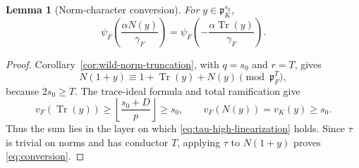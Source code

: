\documentclass[11pt]{amsart}
\newtheorem{lemma}[theorem]{Lemma}
\theoremstyle{definition}
\theoremstyle{remark}
\newcommand{\p}{\mathfrak p}
\newcommand{\Tr}{\operatorname{Tr}}
\begin{document}
\begin{lemma}[Norm-character conversion]\label{lem:norm-character-conversion}
For $y\in\p_K^{s_0}$,
\begin{equation}\label{eq:conversion}
 \psi_F\!\left(\frac{\alpha N(y)}{\gamma_F}\right)
 =\psi_F\!\left(-\frac{\alpha\Tr(y)}{\gamma_F}\right).
\end{equation}
\end{lemma}

\begin{proof}
Corollary~\ref{cor:wild-norm-truncation}, with $q=s_0$ and $r=T$,
gives
\[
 N(1+y)\equiv1+\Tr(y)+N(y)\pmod{\p_F^T},
\]
because $2s_0\ge T$.  The trace-ideal formula and total ramification
give
\[
 v_F(\Tr(y))\ge
 \left\lfloor\frac{s_0+D}{p}\right\rfloor\ge s_0,
 \qquad v_F(N(y))=v_K(y)\ge s_0.
\]
Thus the sum lies in the layer on which
\eqref{eq:tau-high-linearization} holds.  Since $\tau$ is trivial on
norms and has conductor $T$, applying $\tau$ to $N(1+y)$ proves
\eqref{eq:conversion}.
\end{proof}
\end{document}
